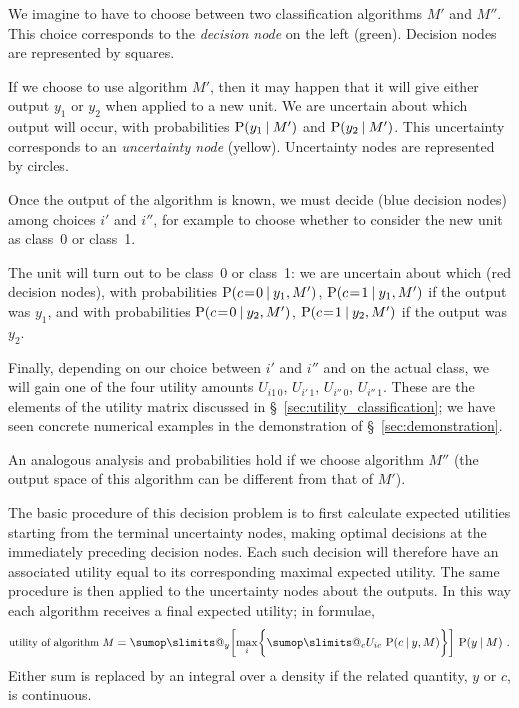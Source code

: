 \documentclass[\ifafour a4paper,12pt,\else a5paper,10pt,\fi%
onecolumn,oneside,article,%
british%
]{memoir}
\makeatletter
\theoremstyle{remark}
\theoremstyle{innote}
\def\sum{\DOTSI\sumop\slimits@}
\DeclarePairedDelimiter\set{\{}{\}} %
\renewcommand*{\P}{\mathrm{P}}%
\renewcommand*{\|}[1][]{\nonscript\:#1\vert\nonscript\:\mathopen{}}
\newcommand*{\mo}[1][=]{\mathrel{\mkern-3.5mu#1\mkern-3.5mu}}
\newcommand*{\sect}{\S}%
\newcommand*{\texts}[1]{\text{\small #1}}
\makeatother
\begin{document}
We imagine to have to choose between two classification algorithms $M'$ and $M''$. This choice corresponds to the \emph{decision node} on the left (green). Decision nodes are represented by squares.

If we choose to use algorithm $M'$, then it may happen that it will give either output $y_{1}$ or $y_{2}$ when applied to a new unit. We are uncertain about which output will occur, with probabilities $\P(y_{1} \| M')$ and $\P(y_{2} \| M')$. This uncertainty corresponds to an \emph{uncertainty node} (yellow). Uncertainty nodes are represented by circles.

Once the output of the algorithm is known, we must decide (blue decision nodes) among choices $i'$ and $i''$, for example to choose whether to consider the new unit as class~0 or class~1.

The unit will turn out to be class~0 or class~1: we are uncertain about which (red decision nodes), with probabilities $\P(c\mo0 \| y_{1}, M')$, $\P(c\mo1 \| y_{1}, M')$ if the output was $y_{1}$, and with probabilities $\P(c\mo0 \| y_{2}, M')$, $\P(c\mo1 \| y_{2}, M')$ if the output was $y_{2}$.

Finally, depending on our choice between $i'$ and $i''$ and on the actual class, we will gain one of the four utility amounts $U_{i1\, 0}$, $U_{i'\, 1}$, $U_{i''\, 0}$, $U_{i''\, 1}$. These are the elements of the utility matrix discussed in \sect~\ref{sec:utility_classification}; we have seen concrete numerical examples in the demonstration of \sect~\ref{sec:demonstration}.

An analogous analysis and probabilities hold if we choose algorithm $M''$ (the output space of this algorithm can be different from that of $M'$).

The basic procedure of this decision problem is to first calculate expected utilities starting from the terminal uncertainty nodes, making optimal decisions at the immediately preceding decision nodes. Each such decision will therefore have an associated utility equal to its corresponding maximal expected utility. The same procedure is then applied to the uncertainty nodes about the outputs. In this way each algorithm receives a final expected utility; in formulae,
\begin{equation}
  \label{eq:algorithm_utility}
\texts{utility of algorithm $M$} =  \sum_{y} \biggl[\max_{i}\set[\bigg]{\sum_{c} U_{ic}\ \P(c \| y, M)}\biggr]\
  \P(y \| M) \ .
\end{equation}
Either sum is replaced by an integral over a density if the related quantity, $y$ or $c$, is continuous.
\end{document}
